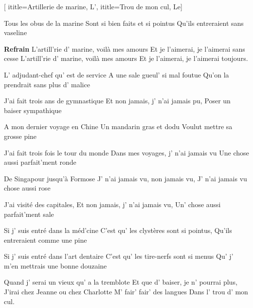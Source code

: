 [
  ititle={Artillerie de marine, L'},
  ititle={Trou de mon cul, Le}]


\beginverse
Tous les obus de la marine
Sont si bien faits et si pointus
Qu'ils entreraient sans vaseline
\endverse

\beginchorus
\textbf{Refrain}
L'artill'rie d' marine, voilà mes amours
Et je l'aimerai, je l'aimerai sans cesse
L'artill'rie d' marine, voilà mes amours
Et je l'aimerai, je l'aimerai toujours.
\endchorus

\beginverse
L' adjudant-chef qu' est de service
A une sale gueul' si mal foutue
Qu'on la prendrait sans plus d' malice
\endverse

\beginverse
J'ai fait trois ans de gymnastique
Et non jamais, j' n'ai jamais pu,
Poser un baiser sympathique
\endverse

\beginverse
A mon dernier voyage en Chine
Un mandarin gras et dodu
Voulut mettre sa grosse pine
\endverse

\beginverse
J'ai fait trois fois le tour du monde
Dans mes voyages, j' n'ai jamais vu
Une chose aussi parfait'ment ronde
\endverse

\beginverse
De Singapour jusqu'à Formose
J' n'ai jamais vu, non jamais vu,
J' n'ai jamais vu chose aussi rose
\endverse

\beginverse
J'ai visité des capitales,
Et non jamais, j' n'ai jamais vu,
Un' chose aussi parfait'ment sale
\endverse

\beginverse
Si j' suis entré dans la méd'cine
C'est qu' les clystères sont si pointus,
Qu'ils entreraient comme une pine
\endverse

\beginverse
Si j' suis entré dans l'art dentaire
C'est qu' les tire-nerfs sont si menus
Qu' j' m'en mettrais une bonne douzaine
\endverse

\beginverse
Quand j' serai un vieux qu' a la tremblote
Et que d' baiser, je n' pourrai plus,
J'irai chez Jeanne ou chez Charlotte
M' fair' fair' des langues
Dans l' trou d' mon cul.
\endverse

\endsong
